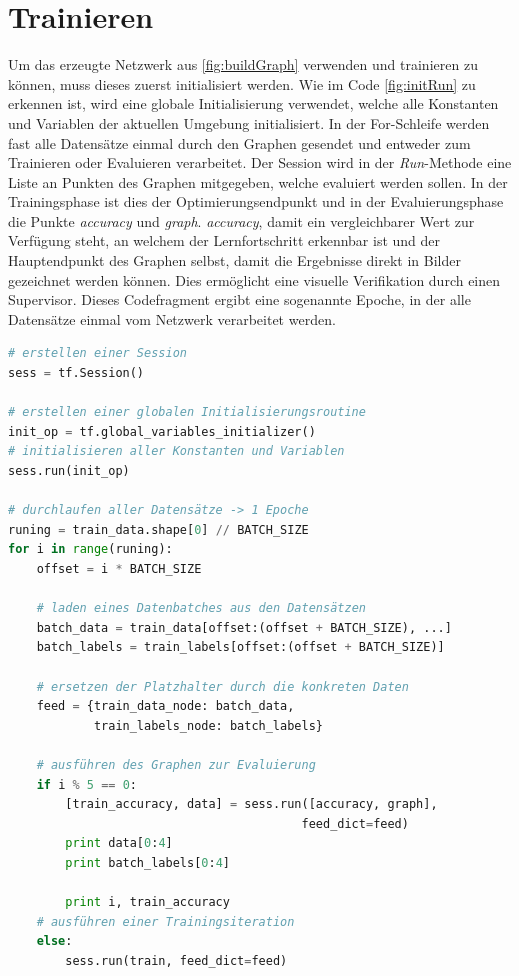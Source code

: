 \section{Trainieren}

Um das erzeugte Netzwerk aus \ref{fig:buildGraph} verwenden und trainieren zu können, muss dieses zuerst initialisiert werden. 
Wie im Code \ref{fig:initRun} zu erkennen ist, wird eine globale Initialisierung verwendet, welche alle Konstanten und Variablen der aktuellen Umgebung initialisiert. 
In der For-Schleife werden fast alle Datensätze einmal durch den Graphen gesendet und entweder zum Trainieren oder Evaluieren verarbeitet. 
Der Session wird in der \textit{Run}-Methode eine Liste an Punkten des Graphen mitgegeben, welche evaluiert werden sollen. 
In der Trainingsphase ist dies der Optimierungsendpunkt und in der Evaluierungsphase die Punkte \textit{accuracy} und \textit{graph}. 
\textit{accuracy}, damit ein vergleichbarer Wert zur Verfügung steht, an welchem der Lernfortschritt erkennbar ist und der Hauptendpunkt des Graphen selbst, damit die Ergebnisse direkt in Bilder gezeichnet werden können. 
Dies ermöglicht eine visuelle Verifikation durch einen Supervisor. 
Dieses Codefragment ergibt eine sogenannte Epoche, in der alle Datensätze einmal vom Netzwerk verarbeitet werden. 
\begin{lstlisting}[caption={Initialisierung des Graphen und durchführen einer Epoche},label=fig:initRun,captionpos=b,language=Python]
# erstellen einer Session
sess = tf.Session()

# erstellen einer globalen Initialisierungsroutine
init_op = tf.global_variables_initializer()
# initialisieren aller Konstanten und Variablen
sess.run(init_op)

# durchlaufen aller Datensätze -> 1 Epoche
runing = train_data.shape[0] // BATCH_SIZE
for i in range(runing):
    offset = i * BATCH_SIZE
    
    # laden eines Datenbatches aus den Datensätzen
    batch_data = train_data[offset:(offset + BATCH_SIZE), ...]
    batch_labels = train_labels[offset:(offset + BATCH_SIZE)]
    
    # ersetzen der Platzhalter durch die konkreten Daten
    feed = {train_data_node: batch_data, 
            train_labels_node: batch_labels}
     
    # ausführen des Graphen zur Evaluierung
    if i % 5 == 0:
        [train_accuracy, data] = sess.run([accuracy, graph], 
        								 feed_dict=feed)
        print data[0:4]
        print batch_labels[0:4]
        
        print i, train_accuracy
    # ausführen einer Trainingsiteration
    else:
        sess.run(train, feed_dict=feed)
\end{lstlisting}

